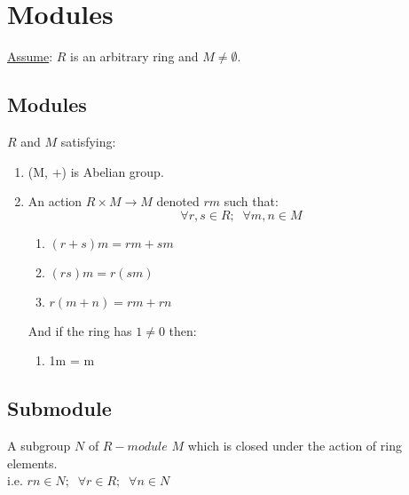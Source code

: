 \chapter{Modules}
\underline{Assume}: $R$ is an arbitrary ring and $M \not = \emptyset$.
\section{Modules}
\begin{defn}
	$R$ and $M$ satisfying:
	\begin{enumerate}
		\item (M, +) is Abelian group.
		\item An action $R \times M \to M$ denoted $rm$ such that:
		\[ \forall r, s \in R; \; \; \forall m, n \in M \]
		\begin{enumerate}
			\item $(r + s)m = rm + sm$
			\item $(rs)m = r(sm)$
			\item $r(m + n) = rm + rn$
		\end{enumerate}
	And if the ring has $1 \not = 0$ then:
	\begin{enumerate}
		\item 1m = m
	\end{enumerate}
	\end{enumerate}
\end{defn}

\section{Submodule}
\begin{defn}[Submodule]
	A subgroup $N$ of $R-module$ $M$ which is closed under the action of ring elements. \\
	
	i.e. $rn \in N; \; \; \forall r \in R; \; \; \forall n \in N$
\end{defn}